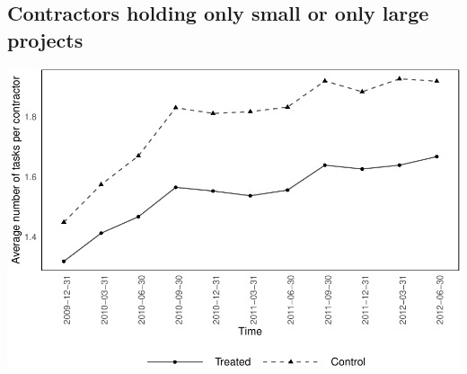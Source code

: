 \documentclass[
]{article}
\begin{document}
\hypertarget{contractors-holding-only-small-or-only-large-projects-2}{%
\subsection{Contractors holding only small or only large
projects}\label{contractors-holding-only-small-or-only-large-projects-2}}

\includegraphics{qp_first_pc_delay-2_files/figure-latex/tasks_0-1.pdf}
\end{document}
